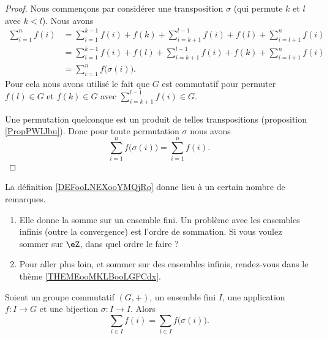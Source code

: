 \begin{proof}
	Nous commençons par considérer une transposition \( \sigma\) (qui permute \( k\) et \( l\) avec \( k<l\)). Nous avons
	\begin{subequations}
		\begin{align}
			\sum_{i=1}^nf(i) & =\sum_{i=1}^{k-1}f(i)+f(k)+\sum_{i=k+1}^{l-1}f(i)+f(l)+\sum_{i=l+1}^nf(i) \\
			                 & =\sum_{i=1}^{k-1}f(i)+f(l)+\sum_{i=k+1}^{l-1}f(i)+f(k)+\sum_{i=l+1}^nf(i) \\
			                 & =\sum_{i=1}^nf\big( \sigma(i) \big).
		\end{align}
	\end{subequations}
	Pour cela nous avons utilisé le fait que \( G\) est commutatif pour permuter \( f(l)\in G\) et \( f(k)\in G\) avec \( \sum_{i=k+1}^{l-1}f(i)\in G\).

	Une permutation quelconque est un produit de telles transpositions (proposition \ref{PropPWIJbu}). Donc pour toute permutation \( \sigma\) nous avons
	\begin{equation}
		\sum_{i=1}^nf\big( \sigma(i) \big)=\sum_{i=1}^nf(i).
	\end{equation}
\end{proof}

La définition \ref{DEFooLNEXooYMQjRo} donne lieu à un certain nombre de remarques.
\begin{enumerate}
	\item
	      Elle donne la somme sur un ensemble fini. Un problème avec les ensembles infinis (outre la convergence) est l'ordre de sommation. Si vous voulez sommer sur \( \eZ\), dans quel ordre le faire ?
	\item
	      Pour aller plus loin, et sommer sur des ensembles infinis, rendez-vous dans le thème \ref{THEMEooMKLBooLGFCdx}.
\end{enumerate}

\begin{proposition}     \label{PROPooJBQVooNqWErk}
	Soient un groupe commutatif \( (G,+)\), un ensemble fini \( I\), une application \( f\colon I\to G\) et une bijection \( \sigma\colon I\to I\). Alors
	\begin{equation}
		\sum_{i\in I}f(i)=\sum_{i\in I}f\big( \sigma(i) \big).
	\end{equation}
\end{proposition}

